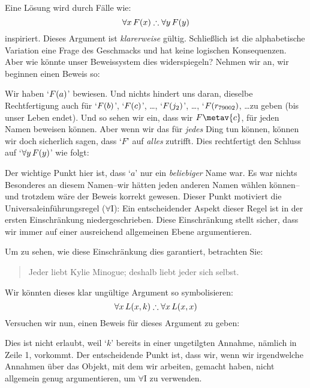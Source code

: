 Eine Lösung wird durch Fälle wie:
$$\forall x\,\atom{F}{x} \therefore \forall y\,\atom{F}{y}$$
inspiriert. Dieses Argument ist \emph{klarerweise} gültig. Schlie{\ss}lich ist die alphabetische Variation eine Frage des Geschmacks und hat keine logischen Konsequenzen. Aber wie könnte unser Beweissystem dies widerspiegeln? Nehmen wir an, wir beginnen einen Beweis so:
\begin{fitchproof}
	 
\end{fitchproof}
Wir haben `$\mathord{F}(a)$' bewiesen. Und nichts hindert uns daran, dieselbe Rechtfertigung auch für `$\mathord{F}(b)$', `$\mathord{F}(c)$', \ldots, `$\mathord{F}(j_2)$', \ldots, `$\mathord{F}(r_{79002})$, \dots zu geben (bis unser Leben endet). Und so sehen wir ein, dass wir $F\metav{c}$, für jeden Namen  beweisen können. Aber wenn wir das für \emph{jedes} Ding tun können, können wir doch sicherlich sagen, dass `$F$' auf \emph{alles} zutrifft. Dies rechtfertigt den Schluss auf `$\forall y\,\mathord{F}(y)$' wie folgt:
\begin{fitchproof}
	 
	 
\end{fitchproof}
Der wichtige Punkt hier ist, dass `$a$' nur ein \emph{beliebiger} Name war. Es war nichts Besonderes an diesem Namen--wir hätten jeden anderen Namen wählen können--und trotzdem wäre der Beweis korrekt gewesen. Dieser Punkt motiviert die Universaleinführungsregel ($\forall$I):
Ein entscheidender Aspekt dieser Regel ist in der ersten Einschränkung niedergeschrieben. Diese Einschränkung stellt sicher, dass wir immer auf einer ausreichend allgemeinen Ebene argumentieren.

Um zu sehen, wie diese Einschränkung dies garantiert, betrachten Sie:
	\begin{quote}
		Jeder liebt Kylie Minogue; deshalb liebt jeder sich selbst.
	\end{quote}
Wir könnten dieses klar ungültige Argument so symbolisieren:
$$\forall x\,\atom{L}{x,k} \therefore \forall x\,\atom{L}{x,x}$$
Versuchen wir nun, einen Beweis für dieses Argument zu geben:
\begin{fitchproof}
	 
	 
\end{fitchproof}\noindent
Dies ist nicht erlaubt, weil `$k$' bereits in einer ungetilgten Annahme, nämlich in Zeile 1, vorkommt. Der entscheidende Punkt ist, dass wir, wenn wir irgendwelche Annahmen über das Objekt, mit dem wir arbeiten, gemacht haben, nicht allgemein genug argumentieren, um $\forall$I zu verwenden.

